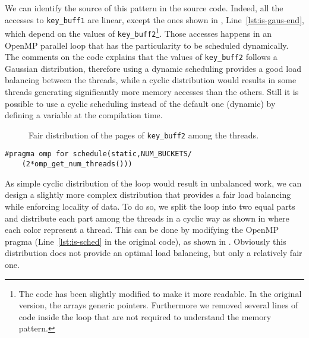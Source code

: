 We can identify the source of this pattern in the \IS source code.
Indeed, all the accesses to \texttt{key\_buff1} are linear, except the ones shown in , Line~\ref{lst:is-gaus-end}, which depend on the values of \texttt{key\_buff2}\footnote{
    The code has been slightly modified to make it more readable.
    In the original version, the arrays generic pointers.
    Furthermore we removed several lines of code inside the loop that are not required to understand the memory pattern.
    }.
Those accesses happens in an \gls{OpenMP} parallel loop that has the particularity to be scheduled dynamically.
The comments on the \IS code explains that the values of \texttt{key\_buff2} follows a Gaussian distribution, therefore using a dynamic scheduling provides a good load balancing between the threads, while a cyclic distribution would results in some threads generating significantly more memory accesses than the others.
Still it is possible to use a cyclic scheduling instead of the default one (dynamic) by defining a variable at the compilation time.

\begin{figure}[htb]
    \centering
    
    \caption{Fair distribution of the pages of \texttt{key\_buff2} among the threads.}
    \label{fig:is-fair}
\end{figure}

\begin{lstlisting}[caption={Modified IS code.}, label=lst:is-modif,float=htb]
#pragma omp for schedule(static,NUM_BUCKETS/
    (2*omp_get_num_threads()))
\end{lstlisting}

As simple cyclic distribution of the loop would result in unbalanced work, we can design a slightly more complex distribution that provides a fair load balancing while enforcing locality of data.
To do so, we split the loop into two equal parts and distribute each part among the threads in a cyclic way  as shown in  where each color represent a thread.
This can be done by modifying the \gls{OpenMP} pragma (Line~\ref{lst:is-sched} in the original code), as shown in .
Obviously this distribution does not provide an optimal load balancing, but only a relatively fair one.

